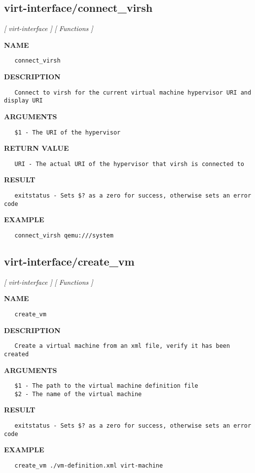 \subsection{virt-interface/connect\_virsh}
\textsl{[ virt-interface ]}
\textsl{[ Functions ]}

\label{ch:robo60}
\label{ch:virt_interface_connect_virsh}
\textbf{NAME}
\begin{verbatim}
   connect_virsh
\end{verbatim}
\textbf{DESCRIPTION}
\begin{verbatim}
   Connect to virsh for the current virtual machine hypervisor URI and display URI
\end{verbatim}
\textbf{ARGUMENTS}
\begin{verbatim}
   $1 - The URI of the hypervisor
\end{verbatim}
\textbf{RETURN VALUE}
\begin{verbatim}
   URI - The actual URI of the hypervisor that virsh is connected to
\end{verbatim}
\textbf{RESULT}
\begin{verbatim}
   exitstatus - Sets $? as a zero for success, otherwise sets an error code
\end{verbatim}
\textbf{EXAMPLE}
\begin{verbatim}
   connect_virsh qemu:///system
\end{verbatim}
\newpage
\subsection{virt-interface/create\_vm}
\textsl{[ virt-interface ]}
\textsl{[ Functions ]}

\label{ch:robo61}
\label{ch:virt_interface_create_vm}
\textbf{NAME}
\begin{verbatim}
   create_vm
\end{verbatim}
\textbf{DESCRIPTION}
\begin{verbatim}
   Create a virtual machine from an xml file, verify it has been created 
\end{verbatim}
\textbf{ARGUMENTS}
\begin{verbatim}
   $1 - The path to the virtual machine definition file
   $2 - The name of the virtual machine
\end{verbatim}
\textbf{RESULT}
\begin{verbatim}
   exitstatus - Sets $? as a zero for success, otherwise sets an error code
\end{verbatim}
\textbf{EXAMPLE}
\begin{verbatim}
   create_vm ./vm-definition.xml virt-machine
\end{verbatim}
\newpage

